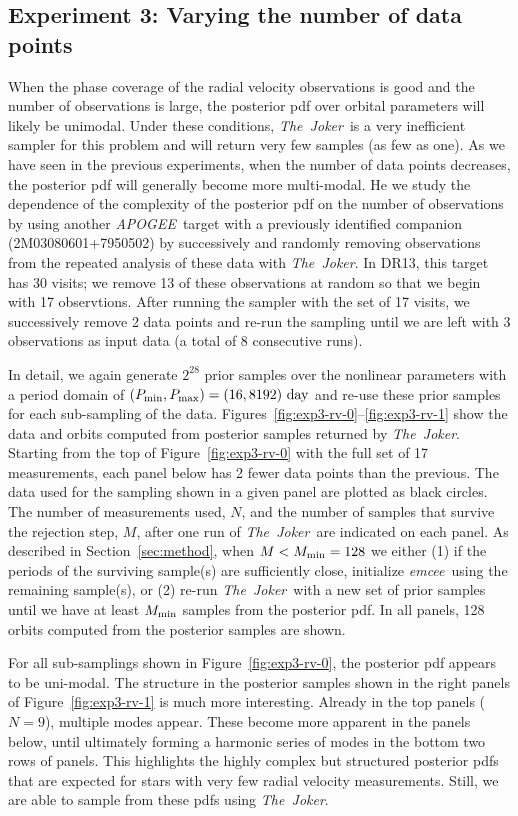 \documentclass[manuscript, letterpaper]{aastex6}
\newcommand{\project}[1]{\textsl{#1}}
\newcommand{\acronym}[1]{{\small{#1}}}
\newcommand{\apogee}{\project{\acronym{APOGEE}}}
\newcommand{\samplername}{\project{The~Joker}}
\newcommand{\emcee}{\project{emcee}}
\newcommand{\sectionname}{Section}
\newcommand{\figname}{Figure}
\begin{document}
\subsection{Experiment 3: Varying the number of data points}

When the phase coverage of the radial velocity observations is good and the
number of observations is large, the posterior pdf over orbital parameters will
likely be unimodal.
Under these conditions, \samplername\ is a very inefficient sampler for this
problem and will return very few samples (as few as one).
As we have seen in the previous experiments, when the number of data points
decreases, the posterior pdf will generally become more multi-modal.
He we study the dependence of the complexity of the posterior pdf on the number
of observations by using another \apogee\ target with a previously identified
companion (2M03080601+7950502) by successively and randomly removing
observations from the repeated analysis of these data with \samplername.
In DR13, this target has 30 visits; we remove 13 of these observations at random
so that we begin with 17 observtions.
After running the sampler with the set of 17 visits, we successively remove 2
data points and re-run the sampling until we are left with 3 observations as
input data (a total of 8 consecutive runs).

In detail, we again generate $2^{28}$ prior samples over the nonlinear
parameters with a period domain of $(P_{\rm min}, P_{\rm max}) = (16, 8192)~{\rm
day}$ and re-use these prior samples for each sub-sampling of the data.
\figname s~\ref{fig:exp3-rv-0}--\ref{fig:exp3-rv-1} show the data and orbits
computed from posterior samples returned by \samplername.
Starting from the top of \figname~\ref{fig:exp3-rv-0} with the full set of 17
measurements, each panel below has 2 fewer data points than the previous.
The data used for the sampling shown in a given panel are plotted as black
circles.
The number of measurements used, $N$, and the number of samples that survive the
rejection step, $M$, after one run of \samplername\ are indicated on each panel.
As described in \sectionname~\ref{sec:method}, when $M < M_{\rm min}=128$ we
either (1) if the periods of the surviving sample(s) are sufficiently close,
initialize \emcee\ using the remaining sample(s), or (2) re-run \samplername\
with a new set of prior samples until we have at least $M_{\rm min}$ samples
from the posterior pdf.
In all panels, 128 orbits computed from the posterior samples are shown.

For all sub-samplings shown in \figname~\ref{fig:exp3-rv-0}, the posterior pdf
appears to be uni-modal.
The structure in the posterior samples shown in the right panels of
\figname~\ref{fig:exp3-rv-1} is much more interesting.
Already in the top panels ($N=9$), multiple modes appear.
These become more apparent in the panels below, until ultimately forming a
harmonic series of modes in the bottom two rows of panels.
This highlights the highly complex but structured posterior pdfs that are
expected for stars with very few radial velocity measurements.
Still, we are able to sample from these pdfs using \samplername.
\end{document}
